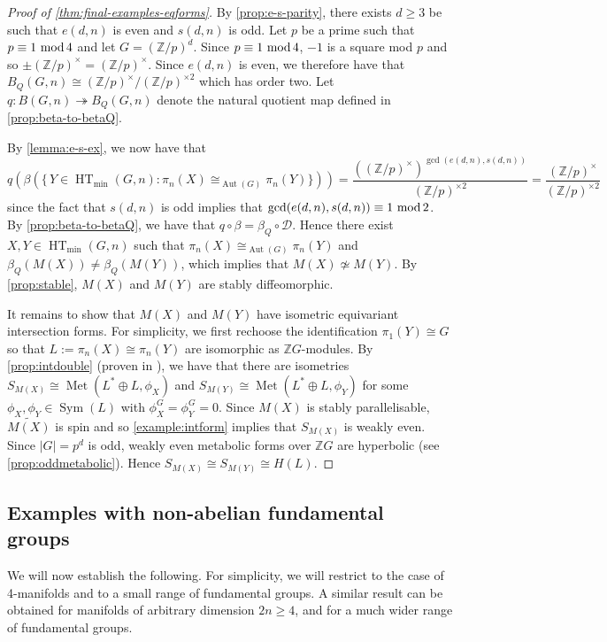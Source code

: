 \documentclass[11pt,a4paper,leqno]{amsart}
\theoremstyle{definition}
\theoremstyle{remark}
\newcommand{\wt}{\widetilde}
\newcommand{\Z}{\mathbb{Z}}
\renewcommand{\mod}{\,\,\text{\normalfont mod}\,}
\DeclareMathOperator{\Aut}{Aut}
\DeclareMathOperator{\HT}{HT}
\DeclareMathOperator{\Met}{Met}
\DeclareMathOperator{\Sym}{Sym}
\begin{document}
\begin{proof}[Proof of \cref{thm:final-examples-eqforms}]
By \cref{prop:e-s-parity}, there exists $d \ge 3$ be such that $e(d,n)$ is even and $s(d,n)$ is odd. Let $p$ be a prime such that $p \equiv 1 \mod 4$ and let $G = (\Z/p)^d$. Since $p \equiv 1 \mod 4$, $-1$ is a square mod $p$ and so $\pm (\Z/p)^\times = (\Z/p)^\times$. Since $e(d,n)$ is even, we therefore have that $B_Q(G,n) \cong (\Z/p)^\times/(\Z/p)^{\times 2}$ which has order two.
Let $q\colon B(G,n) \twoheadrightarrow B_Q(G,n)$ denote the natural quotient map defined in \cref{prop:beta-to-betaQ}. 

By \cref{lemma:e-s-ex}, we now have that
\[ q(\beta(\{\, Y \in \HT_{\min}(G,n) : \pi_n(X) \cong_{\Aut(G)} \pi_n(Y)\})) = \frac{((\Z/p)^\times)^{\gcd(e(d,n),s(d,n))}}{(\Z/p)^{\times 2}} = \frac{(\Z/p)^\times}{(\Z/p)^{\times 2}}  \]
since the fact that $s(d,n)$ is odd implies that $\gcd(e(d,n),s(d,n)) \equiv 1 \mod 2$. By \cref{prop:beta-to-betaQ}, we have that $q \circ \beta = \beta_Q \circ \mathscr{D}$. Hence there exist $X, Y \in \HT_{\min}(G,n)$ such that $\pi_n(X) \cong_{\Aut(G)} \pi_n(Y)$ and $\beta_Q(M(X)) \ne \beta_Q(M(Y))$, which implies that $M(X) \not \simeq M(Y)$.
By \cref{prop:stable}, $M(X)$ and $M(Y)$ are stably diffeomorphic. 

It remains to show that $M(X)$ and $M(Y)$ have isometric equivariant intersection forms. For simplicity, we first rechoose the identification $\pi_1(Y) \cong G$ so that $L := \pi_n(X) \cong \pi_n(Y)$ are isomorphic as $\Z G$-modules.
By \cref{prop:intdouble} (proven in \cite[Proposition II.2]{Kreck:1984}), we have that there are isometries $S_{M(X)} \cong \Met(L^* \oplus L,\phi_X)$ and $S_{M(Y)} \cong \Met(L^* \oplus L,\phi_Y)$ for some $\phi_X,\phi_Y \in \Sym(L)$ with $\phi_X^G = \phi_Y^G = 0$.
 Since $M(X)$ is stably parallelisable, $\wt{M(X)}$ is spin and so \cref{example:intform} implies that $S_{M(X)}$ is weakly even. Since $|G| = p^d$ is odd, weakly even metabolic forms over $\Z G$ are hyperbolic (see \cref{prop:oddmetabolic}).
Hence $S_{M(X)} \cong S_{M(Y)} \cong H(L)$.
\end{proof}

\subsection{Examples with non-abelian fundamental groups} \label{ss:examples-non-abelian}

We will now establish the following. For simplicity, we will restrict to the case of 4-manifolds and to a small range of fundamental groups. A similar result can be obtained for manifolds of arbitrary dimension $2n \ge 4$, and for a much wider range of fundamental groups. 
\end{document}
